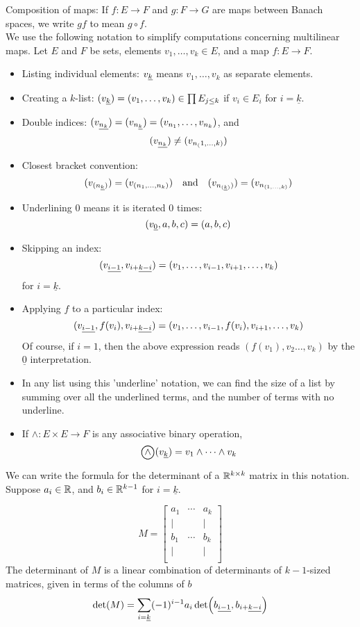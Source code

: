 \documentclass[../main-manifolds.tex]{subfiles}
\begin{document}
Composition of maps: If $f: E\to F$ and $g: F\to G$ are maps between Banach spaces, we write $gf$ to mean $g\circ f$. \\

We use the following notation to simplify computations concerning multilinear maps. Let $E$ and $F$ be sets, elements $v_1,\ldots, v_k\in E$, and a map $f: E\to F$.
\begin{itemize}
    \item Listing individual elements: $\UL{v}[k]$ means $v_1,\ldots,v_k$ as separate elements. 
    \item Creating a $k$-list: $(\UL{v}[k]) = (v_1,\ldots, v_k)\in \prod E_{j\leq k}$ if $v_i\in E_i$ for $i = \underline{k}$.
    \item Double indices: $(\UL{v}[n_k]) = (v_{n_{\underline{k}}}) = (v_{n_1},\ldots, v_{n_k})$, and
    \[
        (\UL{v}[n_k]) \neq (v_{n_(1,\ldots,k)})
    \]
    \item Closest bracket convention:
    \[
        (v_{(n_{\underline{k}})}) = (v_{(n_1, \ldots, n_k)})\qqtext{and}(v_{n_{(\underline{k})})}) = (v_{n_{(1, \ldots, k)}})
    \]
    \item Underlining $0$ means it is iterated $0$ times: 
    \[
        (\UL{v}[0], a,b,c) = (a,b,c)
    \]
    \item Skipping an index: 
    \[
        (\UL{v}[i-1],\UL{v}[i+][k-i]) = (v_{1},\ldots, v_{i-1},v_{i+1},\ldots, v_{k})
    \]
    for $i = \underline{k}$.
    \item Applying $f$ to a particular index: 
    \[
        (\UL{v}[i-1], f(v_{i}), \UL{v}[i+][k-i]) = (v_1,\ldots, v_{i-1}, f(v_i), v_{i+1}, \ldots, v_k)
    \]
    Of course, if $i=1$, then the above expression reads $(f(v_1), v_2\ldots, v_k)$ by the $\underline{0}$ interpretation.
    \item In any list using this 'underline' notation, we can find the size of a list by summing over all the underlined terms, and the number of terms with no underline.
    \item If $\wedge: E\times E\to F$ is any associative binary operation,
    \[
        \bigowedge(\UL{v}[k]) = v_1\wedge\cdots \wedge v_k
    \]
\end{itemize}
\begin{remark}
We can write the formula for the determinant of a $\mathbb{R}^{k\times k}$ matrix in this notation. Suppose $a_i\in\mathbb{R}$, and $b_i\in\mathbb{R}^{k-1}$ for $i=\underline{k}$.

\[
M = \begin{bmatrix}
    a_1 & \cdots & a_k \\[1ex]
    \vert &  & \vert \\
    b_1 & \cdots & b_k \\
    \vert &  & \vert \\[1ex]
\end{bmatrix}
\]
The determinant of $M$ is a linear combination of determinants of $k-1$-sized matrices, given in terms of the columns of $b$
\[
    \det(M) = \sum_{i=\underline{k}}(-1)^{i-1} a_i\det(\UL{b}[i-1],\UL{b}[i+][k-i])
\]    
\end{remark}
\end{document}
